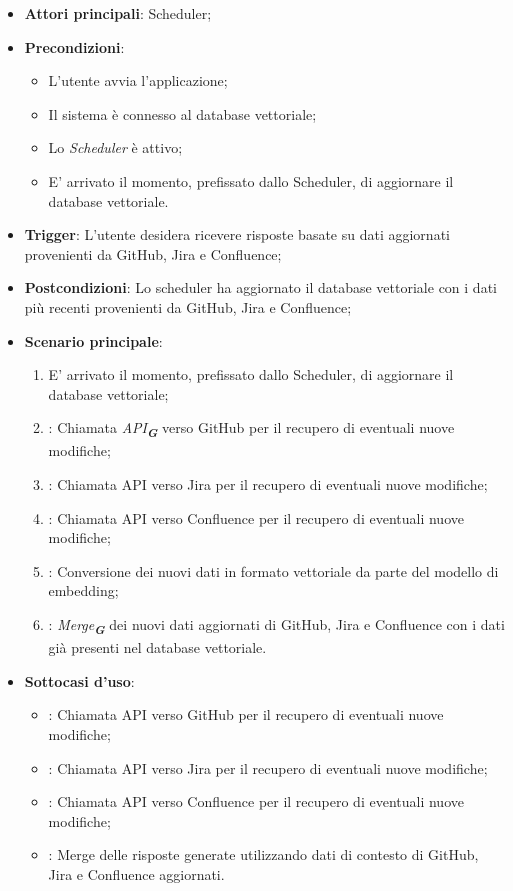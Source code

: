 \begin{itemize}
    \item \textbf{Attori principali}: Scheduler;
    \item \textbf{Precondizioni}: 
    \begin{itemize}
        \item L'utente avvia l'applicazione;
        \item Il sistema è connesso al database vettoriale;
        \item Lo \emph{Scheduler} è attivo;
        \item E' arrivato il momento, prefissato dallo Scheduler, di aggiornare il database vettoriale.
    \end{itemize}
    \item \textbf{Trigger}: L'utente desidera ricevere risposte basate su dati aggiornati provenienti da GitHub, Jira e Confluence;
    \item \textbf{Postcondizioni}: Lo scheduler ha aggiornato il database vettoriale con i dati più recenti provenienti da GitHub, Jira e Confluence;
    \item \textbf{Scenario principale}:
    \begin{enumerate}
        \item E' arrivato il momento, prefissato dallo Scheduler, di aggiornare il database vettoriale;
        \item {}: Chiamata \emph{API}\textsubscript{\textbf{\textit{G}}} verso GitHub per il recupero di eventuali nuove modifiche;
        \item {}: Chiamata API verso Jira per il recupero di eventuali nuove modifiche;
        \item {}: Chiamata API verso Confluence per il recupero di eventuali nuove modifiche;
        \item {}: Conversione dei nuovi dati in formato vettoriale da parte del modello di embedding;
        \item {}: \emph{Merge}\textsubscript{\textbf{\textit{G}}} dei nuovi dati aggiornati di GitHub, Jira e Confluence
        con i dati già presenti nel database vettoriale.
    \end{enumerate}
    \item \textbf{Sottocasi d'uso}:
    \begin{itemize}
        \item {}: Chiamata API verso GitHub per il recupero di eventuali nuove modifiche;
        \item {}: Chiamata API verso Jira per il recupero di eventuali nuove modifiche;
        \item {}: Chiamata API verso Confluence per il recupero di eventuali nuove modifiche;
        \item {}: Merge delle risposte generate utilizzando dati di contesto di GitHub, Jira e Confluence aggiornati.
    \end{itemize}
\end{itemize}

